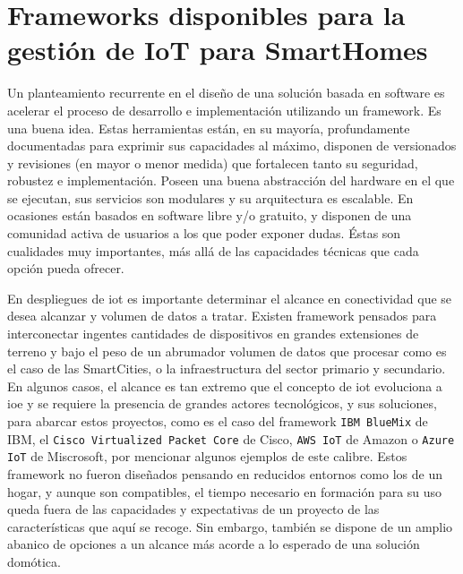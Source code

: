 \section{Frameworks disponibles para la gestión de IoT para SmartHomes}
\label{ch:Capitulo2.2}

Un planteamiento recurrente en el diseño de una solución basada en software es acelerar el proceso de desarrollo e implementación utilizando un \gls{framework}. Es una buena idea. Estas herramientas están, en su mayoría, profundamente documentadas para exprimir sus capacidades al máximo, disponen de versionados y revisiones (en mayor o menor medida) que fortalecen tanto su seguridad, robustez e implementación. Poseen una buena abstracción del hardware en el que se ejecutan, sus servicios son modulares y su arquitectura es escalable. En ocasiones están basados en software libre y/o gratuito, y disponen de una comunidad activa de usuarios a los que poder exponer dudas. Éstas son cualidades muy importantes, más allá de las capacidades técnicas que cada opción pueda ofrecer.

\vspace{1cm}

En despliegues de \gls{iot} es importante determinar el alcance en conectividad que se desea alcanzar y volumen de datos a tratar. Existen \gls{framework} pensados para interconectar ingentes cantidades de dispositivos en grandes extensiones de terreno y bajo el peso de un abrumador volumen de datos que procesar como es el caso de las SmartCities, o la infraestructura del sector primario y secundario. En algunos casos, el alcance es tan extremo que el concepto de \gls{iot} evoluciona a \gls{ioe} y se requiere la presencia de grandes actores tecnológicos, y sus soluciones, para abarcar estos proyectos, como es el caso del framework \verb|IBM BlueMix| de IBM, el \verb|Cisco Virtualized Packet Core| de Cisco, \verb|AWS IoT| de Amazon o \verb|Azure IoT| de Miscrosoft, por mencionar algunos ejemplos de este calibre. Estos \gls{framework} no fueron diseñados pensando en reducidos entornos como los de un hogar, y aunque son compatibles, el tiempo necesario en formación para su uso queda fuera de las capacidades y expectativas de un proyecto de las características que aquí se recoge. Sin embargo, también se dispone de un amplio abanico de opciones a un alcance más acorde a lo esperado de una solución domótica.

\vspace{1cm}

